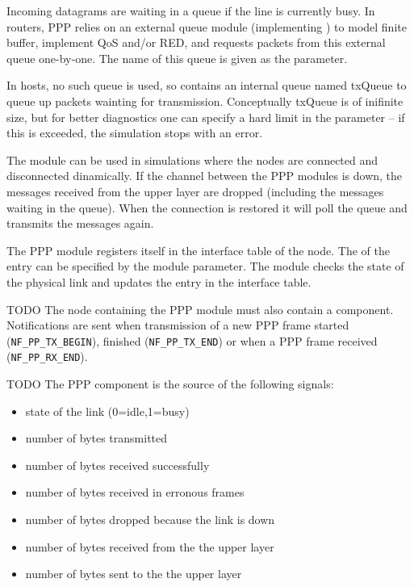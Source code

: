 Incoming datagrams are waiting in a queue if the line is currently busy.
In routers, PPP relies on an external queue module (implementing
) to model finite buffer, implement QoS and/or RED,
and requests packets from this external queue one-by-one. The name
of this queue is given as the  parameter.

In hosts, no such queue is used, so  contains an internal
queue named txQueue to queue up packets wainting for transmission.
Conceptually txQueue is of inifinite size, but for better diagnostics
one can specify a hard limit in the  parameter -- if
this is exceeded, the simulation stops with an error.

The module can be used in simulations where the nodes are connected and
disconnected dinamically. If the channel between the PPP modules is down,
the messages received from the upper layer are dropped (including the messages
waiting in the queue). When the connection is restored it will
poll the queue and transmits the messages again.

The PPP module registers itself in the interface table of the node.
The  of the entry can be specified by the
 module parameter. The module checks the state of the physical link
and updates the entry in the interface table.

\ifdraft TODO
The node containing the PPP module must also contain a
 component. Notifications are sent when
transmission of a new PPP frame started (\verb!NF_PP_TX_BEGIN!), finished
(\verb!NF_PP_TX_END!) or when a PPP frame received (\verb!NF_PP_RX_END!).
\fi

\ifdraft TODO
The PPP component is the source of the following signals:
\begin{itemize}
\item {} state of the link (0=idle,1=busy)
\item {} number of bytes transmitted
\item {} number of bytes received successfully
\item {} number of bytes received in erronous frames
\item {} number of bytes dropped because the link is down
\item {} number of bytes received from the the upper layer
\item {} number of bytes sent to the the upper layer
\end{itemize}

